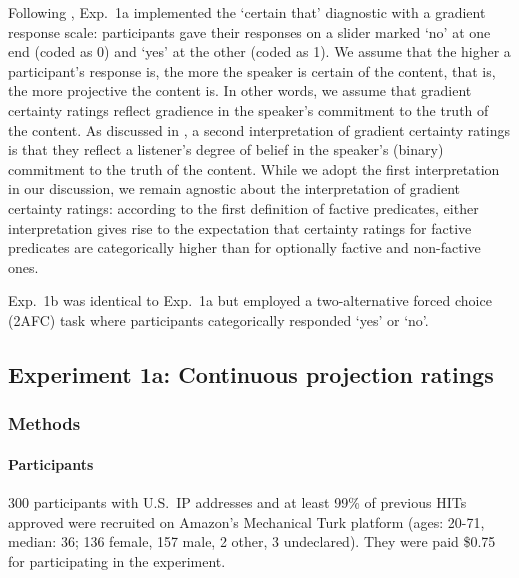 \documentclass[11pt,fleqn]{article}
\newcommand{\6}{\mbox{$[\hspace*{-.6mm}[$}}
\newcommand{\9}{\mbox{$]\hspace*{-.6mm}]$}}
\begin{document}
Following \citealt{tbd-variability}, Exp.~1a implemented the `certain that' diagnostic with a gradient response scale: participants gave their responses on a slider marked `no' at one end (coded as 0) and `yes' at the other (coded as 1). We assume that the higher a participant's response is, the more the speaker is certain of the content, that is, the more projective the content is. In other words, we assume that gradient certainty ratings reflect gradience in the speaker's commitment to the truth of the content. As discussed in \citealt{tbd-variability}, a second interpretation of gradient certainty ratings is that they reflect a listener's degree of belief in the speaker's (binary) commitment to the truth of the content. While we adopt the first interpretation in our discussion, we remain agnostic about the interpretation of gradient certainty ratings:  according to the first definition of factive predicates, either interpretation gives rise to the expectation that certainty ratings for factive predicates are categorically higher than for optionally factive and non-factive ones. 

Exp.~1b was identical to Exp.~1a but employed a two-alternative forced choice (2AFC) task where participants categorically responded `yes' or `no'.
 
\subsection{Experiment 1a: Continuous projection ratings}

\subsubsection{Methods}

\paragraph{Participants} 300 participants with U.S.\ IP addresses and at least 99\% of previous HITs approved were recruited on Amazon's Mechanical Turk platform (ages: 20-71, median: 36; 136 female, 157 male, 2 other, 3 undeclared). They were paid \$0.75 for participating in the experiment.
\end{document}
